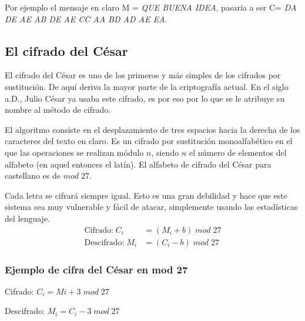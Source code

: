 \documentclass{article}
\newcommand{\RomanNumeralCaps}[1]
    {\MakeUppercase{\romannumeral #1}}
\begin{document}
Por ejemplo el mensaje en claro M = \emph{QUE BUENA IDEA}, pasaría a ser C= \emph{DA DE AE AB DE AE CC AA BD AD AE EA}.



\subsection{El cifrado del César}
\justify
El cifrado del César es uno de los primeros y más simples de los cifrados por sustitución. De aquí deriva la mayor parte de la criptografía actual. En el siglo \RomanNumeralCaps{1} a.D., Julio César ya usaba este cifrado, es por eso por lo que se le atribuye su nombre al método de cifrado.

El algoritmo consiste en el desplazamiento de tres espacios hacia la derecha de los caracteres del texto en claro. Es un cifrado por sustitución monoalfabético en el que las operaciones se realizan módulo $n$, siendo $n$ el número de elementos del alfabeto (en aquel entonces el latín). El alfabeto de cifrado del César para castellano es de $mod \; 27$.

Cada letra se cifrará siempre igual. Esto es una gran debilidad y hace que este sistema sea muy vulnerable y fácil de atacar, simplemente usando las estadísticas del lenguaje.
\begin{equation*}
\begin{split}
    \text{Cifrado:}  \; C_{i} & =(M_{i}+b)\; mod \; 27 \\
    \text{Descifrado:}\; M_{i} & =(C_{i}-b)\; mod \;27 
\end{split}
\end{equation*}




\subsubsection{Ejemplo de cifra del César en mod 27 }

Cifrado: $C_{i}=M{i}+3 \; mod \;27$ 

Descifrado: $M_{i}=C_{i}-3 \;mod \;27$

\end{document}
